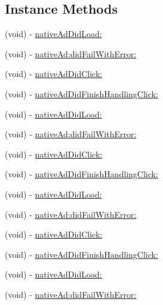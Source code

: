 \subsection*{Instance Methods}
\begin{DoxyCompactItemize}
\item 
(void) -\/ \hyperlink{protocolFBNativeAdDelegate_01-p_abad2ba96d5837eee4c2c7f88e216a9f5}{native\+Ad\+Did\+Load\+:}
\item 
(void) -\/ \hyperlink{protocolFBNativeAdDelegate_01-p_a310f7227d74f4223c64e2543ab346304}{native\+Ad\+:did\+Fail\+With\+Error\+:}
\item 
(void) -\/ \hyperlink{protocolFBNativeAdDelegate_01-p_a6f95570584b282e947d029d855242d11}{native\+Ad\+Did\+Click\+:}
\item 
(void) -\/ \hyperlink{protocolFBNativeAdDelegate_01-p_a94d3846b43d38539da5f28804f75da70}{native\+Ad\+Did\+Finish\+Handling\+Click\+:}
\item 
(void) -\/ \hyperlink{protocolFBNativeAdDelegate_01-p_abad2ba96d5837eee4c2c7f88e216a9f5}{native\+Ad\+Did\+Load\+:}
\item 
(void) -\/ \hyperlink{protocolFBNativeAdDelegate_01-p_a310f7227d74f4223c64e2543ab346304}{native\+Ad\+:did\+Fail\+With\+Error\+:}
\item 
(void) -\/ \hyperlink{protocolFBNativeAdDelegate_01-p_a6f95570584b282e947d029d855242d11}{native\+Ad\+Did\+Click\+:}
\item 
(void) -\/ \hyperlink{protocolFBNativeAdDelegate_01-p_a94d3846b43d38539da5f28804f75da70}{native\+Ad\+Did\+Finish\+Handling\+Click\+:}
\item 
(void) -\/ \hyperlink{protocolFBNativeAdDelegate_01-p_abad2ba96d5837eee4c2c7f88e216a9f5}{native\+Ad\+Did\+Load\+:}
\item 
(void) -\/ \hyperlink{protocolFBNativeAdDelegate_01-p_a310f7227d74f4223c64e2543ab346304}{native\+Ad\+:did\+Fail\+With\+Error\+:}
\item 
(void) -\/ \hyperlink{protocolFBNativeAdDelegate_01-p_a6f95570584b282e947d029d855242d11}{native\+Ad\+Did\+Click\+:}
\item 
(void) -\/ \hyperlink{protocolFBNativeAdDelegate_01-p_a94d3846b43d38539da5f28804f75da70}{native\+Ad\+Did\+Finish\+Handling\+Click\+:}
\item 
(void) -\/ \hyperlink{protocolFBNativeAdDelegate_01-p_abad2ba96d5837eee4c2c7f88e216a9f5}{native\+Ad\+Did\+Load\+:}
\item 
(void) -\/ \hyperlink{protocolFBNativeAdDelegate_01-p_a310f7227d74f4223c64e2543ab346304}{native\+Ad\+:did\+Fail\+With\+Error\+:}

\end{DoxyCompactItemize}

